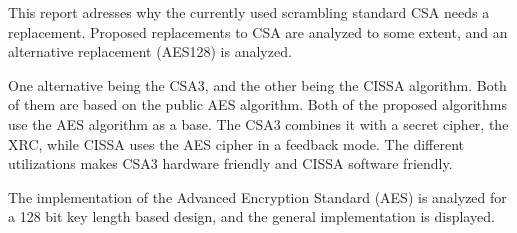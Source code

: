 This report adresses why the currently used scrambling standard CSA 
needs a replacement. Proposed replacements to CSA are analyzed to some 
extent, and an alternative replacement (AES128) is analyzed.

One alternative being the CSA3, and the other being the CISSA algorithm.
Both of them are based on the public AES algorithm. Both of the 
proposed algorithms use the AES algorithm as a base. The CSA3 combines 
it with a secret cipher, the XRC, while CISSA uses the AES cipher in a 
feedback mode. The different utilizations makes CSA3 hardware friendly 
and CISSA software friendly.

The implementation of the Advanced Encryption Standard (AES) is 
analyzed for a 128 bit key length based design, and the general 
implementation is displayed.
